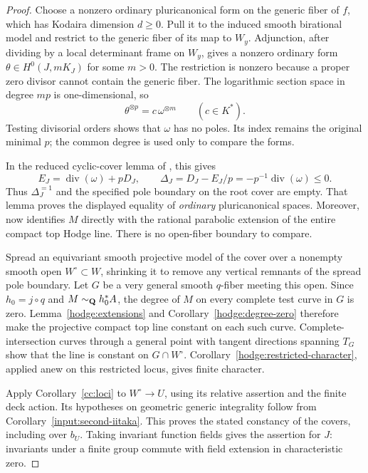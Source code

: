 \begin{proof}
Choose a nonzero ordinary pluricanonical form on the generic fiber
of $f$, which has Kodaira dimension $d\geq0$. Pull it to the induced
smooth birational model and restrict to the generic fiber of its
map to $W_y$. Adjunction, after dividing by a local determinant
frame on $W_y$, gives a nonzero ordinary form
$\theta\in H^0(J,mK_J)$ for some $m>0$. The restriction is nonzero
because a proper zero divisor cannot contain the generic fiber.
The logarithmic section space in degree $mp$ is one-dimensional,
so
\[
                  \theta^{\otimes p}=c\,\omega^{\otimes m}
                  \qquad(c\in K^*).
\]
Testing divisorial orders shows that $\omega$ has no poles. Its
index remains the original minimal $p$; the common degree is used
only to compare the forms.

In the reduced cyclic-cover lemma of \cite[\PoneReducedRoot]{SubadditivityCompanion}, this gives
\[
 E_J=\operatorname{div}(\omega)+pD_J,
 \qquad \Delta_J=D_J-E_J/p
       =-p^{-1}\operatorname{div}(\omega)\leq0.
\]
Thus $\Delta_J^{=1}$ and the specified pole boundary on the root
cover are empty. That lemma proves the displayed equality of
\emph{ordinary} pluricanonical spaces. Moreover,
\cite[\PoneReducedModuli]{SubadditivityCompanion} now identifies $M$
directly with the rational parabolic extension of the entire
compact top Hodge line. There is no open-fiber boundary to compare.

Spread an equivariant smooth projective model of the cover over a
nonempty smooth open $W^\circ\subset W$, shrinking it to remove
any vertical remnants of the spread pole boundary. Let $G$ be a very general
smooth $q$-fiber meeting this open. Since $h_0=j\circ q$ and
$M\sim_{\mathbf Q}h_0^*A$, the degree of $M$ on every complete test curve
in $G$ is zero. Lemma~\ref{hodge:extensions} and
Corollary~\ref{hodge:degree-zero} therefore make the projective
compact top line constant on each such curve. Complete-intersection
curves through a general point with tangent directions spanning
$T_G$ show that the line is constant on $G\cap W^\circ$.
Corollary~\ref{hodge:restricted-character}, applied anew on this
restricted locus, gives finite character.

Apply Corollary~\ref{cc:loci} to $W^\circ\to U$, using its
relative assertion and the finite deck action. Its hypotheses on
geometric generic integrality follow from
Corollary~\ref{input:second-iitaka}. This proves the stated
constancy of the covers, including over $b_U$. Taking invariant
function fields gives the assertion for $J$: invariants under a
finite group commute with field extension in characteristic zero.
\end{proof}

